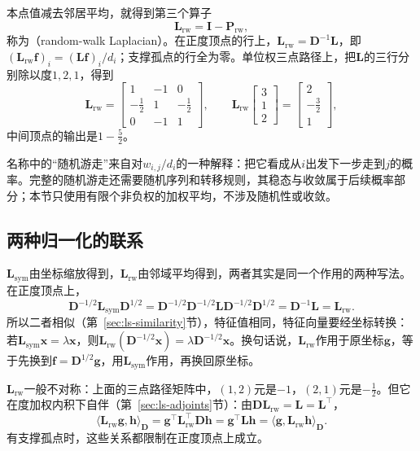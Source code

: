 本点值减去邻居平均，就得到第三个算子
\begin{equation}
 \bm L_{\mathrm{rw}}=\bm I-\bm P_{\mathrm{rw}} ,
 \label{eq:graph-spec-random-walk-laplacian}
\end{equation}
称为（random-walk Laplacian）。在正度顶点的行上，$\bm L_{\mathrm{rw}}=\bm D^{-1}\bm L$，即$(\bm L_{\mathrm{rw}}\bm f)_i=(\bm L\bm f)_i/d_i$；支撑孤点的行全为零。单位权三点路径上，把$\bm L$的三行分别除以度$1,2,1$，得到
\[
 \bm L_{\mathrm{rw}}=\begin{bmatrix}1&-1&0\\-\tfrac12&1&-\tfrac12\\0&-1&1\end{bmatrix},\qquad
 \bm L_{\mathrm{rw}}\begin{bmatrix}3\\1\\2\end{bmatrix}=\begin{bmatrix}2\\-\tfrac32\\1\end{bmatrix},
\]
中间顶点的输出是$1-\tfrac52$。

名称中的“随机游走”来自对$w_{i,j}/d_i$的一种解释：把它看成从$i$出发下一步走到$j$的概率。完整的随机游走还需要随机序列和转移规则，其稳态与收敛属于后续概率部分；本节只使用有限个非负权的加权平均，不涉及随机性或收敛。

\subsection{两种归一化的联系}
\label{sec:graph-spec-normalization-relations}

$\bm L_{\mathrm{sym}}$由坐标缩放得到，$\bm L_{\mathrm{rw}}$由邻域平均得到，两者其实是同一个作用的两种写法。在正度顶点上，
\[
 \bm D^{-1/2}\bm L_{\mathrm{sym}}\bm D^{1/2}=\bm D^{-1/2}\bm D^{-1/2}\bm L\bm D^{-1/2}\bm D^{1/2}=\bm D^{-1}\bm L=\bm L_{\mathrm{rw}} .
\]
所以二者相似（第~\ref{sec:ls-similarity}节），特征值相同，特征向量要经坐标转换：若$\bm L_{\mathrm{sym}}\bm x=\lambda\bm x$，则$\bm L_{\mathrm{rw}}(\bm D^{-1/2}\bm x)=\lambda\bm D^{-1/2}\bm x$。换句话说，$\bm L_{\mathrm{rw}}$作用于原坐标$\bm g$，等于先换到$\bm f=\bm D^{1/2}\bm g$，用$\bm L_{\mathrm{sym}}$作用，再换回原坐标。

$\bm L_{\mathrm{rw}}$一般不对称：上面的三点路径矩阵中，$(1,2)$元是$-1$，$(2,1)$元是$-\tfrac12$。但它在度加权内积下自伴（第~\ref{sec:ls-adjoints}节）：由$\bm D\bm L_{\mathrm{rw}}=\bm L=\bm L^{\top}$，
\[
 \langle\bm L_{\mathrm{rw}}\bm g,\bm h\rangle_{\bm D}=\bm g^{\top}\bm L_{\mathrm{rw}}^{\top}\bm D\bm h=\bm g^{\top}\bm L\bm h=\langle\bm g,\bm L_{\mathrm{rw}}\bm h\rangle_{\bm D} .
\]
有支撑孤点时，这些关系都限制在正度顶点上成立。

